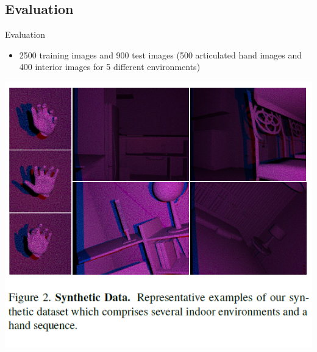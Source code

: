 \subsection{Evaluation}
\begin{frame}{Evaluation}
\begin{itemize}
\item 2500 training images and 900 test images (500 articulated hand images and 400 interior images for 5 different environments)
\end{itemize}
\includegraphics[scale=0.25]{pictures/fig2_synthetic_data}
\end{frame}

